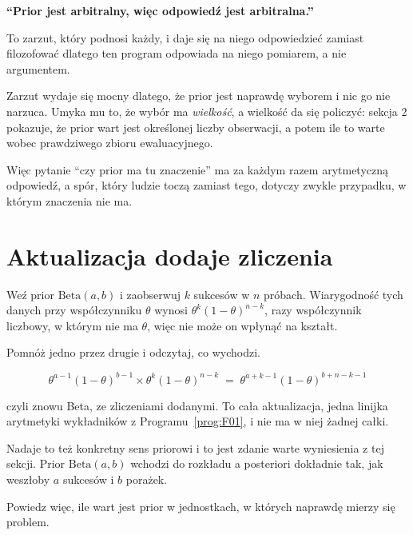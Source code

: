 \begin{fr}
\begin{trapbox}
\textbf{\enquote{Prior jest arbitralny, więc odpowiedź jest arbitralna.}}

To zarzut, który podnosi każdy, i daje się na niego odpowiedzieć zamiast
filozofować \dash{} dlatego ten program odpowiada na niego pomiarem, a nie
argumentem.

Zarzut wydaje się mocny dlatego, że prior jest naprawdę wyborem i nic go nie
narzuca. Umyka mu to, że wybór ma \emph{wielkość}, a wielkość da się policzyć:
sekcja 2 pokazuje, że prior wart jest określonej liczby obserwacji, a potem
\dash{} ile to warte wobec prawdziwego zbioru ewaluacyjnego.

Więc pytanie \enquote{czy prior ma tu znaczenie} ma za każdym razem
arytmetyczną odpowiedź, a spór, który ludzie toczą zamiast tego, dotyczy
zwykle przypadku, w którym znaczenia nie ma.
\end{trapbox}
\end{fr}

\section{Aktualizacja dodaje zliczenia}
\label{sec:P28-conjugacy}

\begin{fr}
Weź prior $\mathrm{Beta}(a, b)$ i zaobserwuj $k$ sukcesów w $n$ próbach.
Wiarygodność tych danych przy współczynniku $\theta$ wynosi
$\theta^{k}(1-\theta)^{n-k}$, razy współczynnik liczbowy, w którym nie ma
$\theta$, więc nie może on wpłynąć na kształt.

Pomnóż jedno przez drugie i odczytaj, co wychodzi.
\dotline
\nextframe
\end{fr}

\begin{fr}

\[ \theta^{a-1}(1-\theta)^{b-1} \times \theta^{k}(1-\theta)^{n-k}
   \;=\; \theta^{a+k-1}(1-\theta)^{b+n-k-1} \]

czyli znowu Beta, ze zliczeniami dodanymi. To cała aktualizacja, jedna linijka
arytmetyki wykładników z Programu~\ref{prog:F01}, i nie ma w niej żadnej
całki.

Nadaje to też konkretny sens priorowi i to jest zdanie warte wyniesienia z tej
sekcji. Prior $\mathrm{Beta}(a, b)$ wchodzi do rozkładu a posteriori dokładnie
tak, jak weszłoby $a$ sukcesów i $b$ porażek.

Powiedz więc, ile wart jest prior w jednostkach, w których naprawdę mierzy się
problem.
\dotline
\nextframe
\end{fr}

